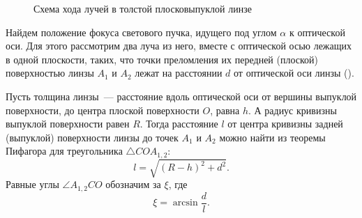 \begin{figure}[h]
    \caption{Схема хода лучей в толстой плосковыпуклой линзе}
    \label{pic:optical-aberrations-coma1}
\end{figure}

Найдем положение фокуса светового пучка, идущего под углом $\alpha$ к оптической оси. Для этого рассмотрим два луча из него, вместе с оптической осью лежащих в одной плоскости, таких, что точки преломления их передней (плоской) поверхностью линзы $A_1$ и $A_2$ лежат на расстоянии $d$ от оптической оси линзы ().

Пусть толщина линзы~--- расстояние вдоль оптической оси от вершины выпуклой поверхности, до центра плоской поверхности $O$, равна $h$. А радиус кривизны выпуклой поверхности равен $R$. Тогда расстояние $l$ от центра кривизны задней (выпуклой) поверхности линзы до точек $A_1$ и $A_2$ можно найти из теоремы Пифагора для треугольника $\triangle COA_{1,2}$:
\begin{equation*}
    l = \sqrt{(R - h)^2 + d^2}.
\end{equation*}
Равные углы $\angle A_{1,2} C O$ обозначим за $\xi$, где
\begin{equation*}
    \xi = \arcsin \frac{d}{l}.
\end{equation*}

